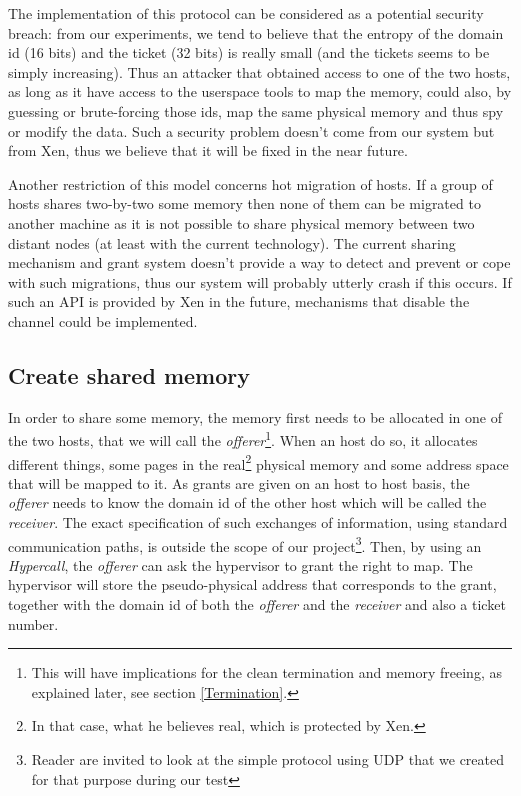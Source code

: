 \documentclass[journal]{IEEEtran}
\begin{document}
The implementation of this protocol can be considered as a potential security breach: from our experiments, we tend to believe that the entropy of the domain id (16 bits) and the ticket (32 bits) is really small (and the tickets seems to be simply increasing). Thus an attacker that obtained access to one of the two hosts, as long as it have access to the userspace tools to map the memory, could also, by guessing or brute-forcing those ids, map the same physical memory and thus spy or modify the data. Such a security problem doesn't come from our system but from Xen, thus we believe that it will be fixed in the near future.

Another restriction of this model concerns hot migration of hosts. If a group of hosts shares two-by-two some memory then none of them can be migrated to another machine as it is not possible to share physical memory between two distant nodes (at least with the current technology). The current sharing mechanism and grant system doesn't provide a way to detect and prevent or cope with such migrations, thus our system will probably utterly crash if this occurs. If such an API is provided by Xen in the future, mechanisms that disable the channel could be implemented.

\subsection{Create shared memory}

In order to share some memory, the memory first needs to be allocated in one of the two hosts, that we will call the \emph{offerer}\footnote{This will have implications for the clean termination and memory freeing, as explained later, see section \ref{Termination}.}. When an host do so, it allocates different things, some pages in the real\footnote{In that case, what he believes real, which is protected by Xen.} physical memory and some address space that will be mapped to it. As grants are given on an host to host basis, the \emph{offerer} needs to know the domain id of the other host which will be called the \emph{receiver}. The exact specification of such exchanges of information, using standard communication paths, is outside the scope of our project\footnote{Reader are invited to look at the simple protocol using UDP that we created for that purpose during our test}. Then, by using an \emph{Hypercall}, the \emph{offerer} can ask the hypervisor to grant the right to map. The hypervisor will store the pseudo-physical address that corresponds to the grant, together with the domain id of both the \emph{offerer} and the \emph{receiver} and also a ticket number.
\end{document}
